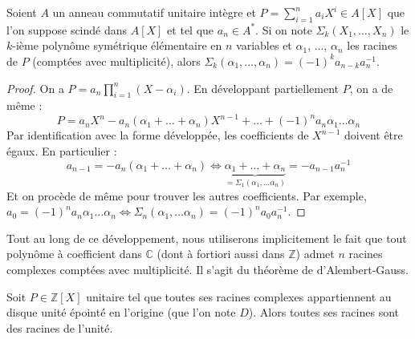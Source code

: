 




	\begin{lemma}
		\label{theoreme-de-kronecker-1}
		Soient $A$ un anneau commutatif unitaire intègre et $P = \sum_{i=1}^n a_iX^i \in A[X]$ que l'on suppose scindé dans $A[X]$ et tel que $a_n \in A^*$. Si on note $\Sigma_k(X_1, \dots, X_n)$ le $k$-ième polynôme symétrique élémentaire en $n$ variables et $\alpha_1$, ..., $\alpha_n$ les racines de $P$ (comptées avec multiplicité), alors $\Sigma_k(\alpha_1, \dots, \alpha_n) = (-1)^k a_{n-k} a_n^{-1}$.
	\end{lemma}

	\begin{proof}
		On a $P = a_n \prod_{i=1}^n (X-\alpha_i)$. En développant partiellement $P$, on a de même :
		\[ P = a_n X^n - a_n (\alpha_1 + \dots + \alpha_n)X^{n-1} + \dots + (-1)^n a_n \alpha_1 \dots \alpha_n \]
		Par identification avec la forme développée, les coefficients de $X^{n-1}$ doivent être égaux. En particulier :
		\[ a_{n-1} = -a_n (\alpha_1 + \dots + \alpha_n) \iff \underbrace{\alpha_1 + \dots + \alpha_n}_{= \Sigma_1(\alpha_1, \dots \alpha_n)} = - a_{n-1} a_n^{-1} \]
		Et on procède de même pour trouver les autres coefficients. Par exemple, $a_0 = (-1)^n a_n \alpha_1 \dots \alpha_n \iff \Sigma_n(\alpha_1, \dots \alpha_n) = (-1)^n a_0 a_n^{-1}$.
	\end{proof}

	\begin{remark}
		Tout au long de ce développement, nous utiliserons implicitement le fait que tout polynôme à coefficient dans $\mathbb{C}$ (dont à fortiori aussi dans $\mathbb{Z}$) admet $n$ racines complexes comptées avec multiplicité. Il s'agit du théorème de d'Alembert-Gauss.
	\end{remark}


	\begin{theorem}[Kronecker]
		\label{theoreme-de-kronecker-2}
		Soit $P \in \mathbb{Z}[X]$ unitaire tel que toutes ses racines complexes appartiennent au disque unité épointé en l'origine (que l'on note $D$). Alors toutes ses racines sont des racines de l'unité.
	\end{theorem}

